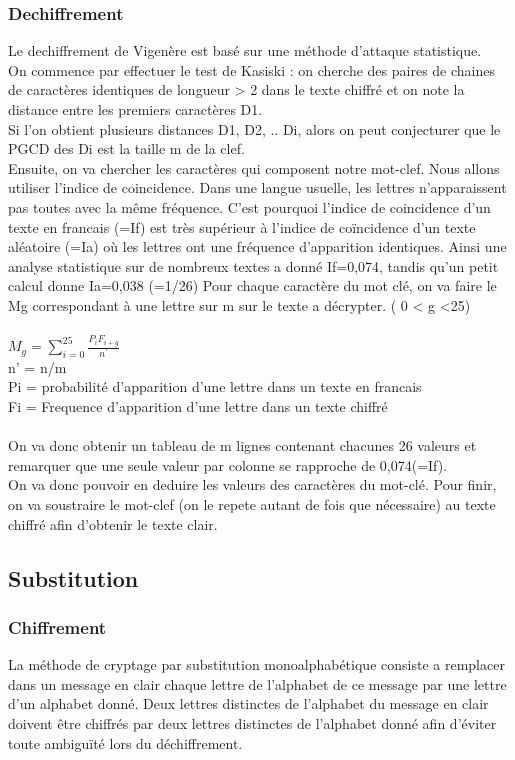 \documentclass[a4]{article}
\begin{document}
			\subsubsection{Dechiffrement}
				Le dechiffrement de Vigenère est basé sur une méthode d'attaque statistique.\\
				On commence par effectuer le test de Kasiski : on cherche des paires de chaines de 
				caractères identiques de longueur > 2 dans le texte chiffré et 
				on note la distance entre les premiers caractères D1.\\
				 Si l'on obtient plusieurs distances D1, D2, .. Di, alors on peut conjecturer que le
				  PGCD des Di est la taille m de la clef.\\
				Ensuite, on va chercher les caractères qui composent notre mot-clef. Nous allons 
				utiliser l'indice de coincidence. Dans une langue usuelle, 
				les lettres n'apparaissent pas toutes avec la même fréquence. C'est pourquoi l'indice 
				de coincidence d'un texte en francais 
				(=If) est très supérieur à l'indice de coïncidence d'un texte aléatoire (=Ia) où les 
				lettres ont une fréquence d'apparition identiques.
				 Ainsi une analyse statistique sur de nombreux textes a donné If=0,074, tandis qu'un 
				 petit calcul donne Ia=0,038 (=1/26)
				Pour chaque caractère du mot clé, on va faire le Mg correspondant à une lettre sur 
				m sur le texte a décrypter. ( 0 < g <25)\\ \\
				$M_{g} = \sum_{i=0}^{25} \frac{P_{i} F_{i+g}}{n^{'}}$\\
				n' = n/m\\
				Pi = probabilité d'apparition d'une lettre dans un texte en francais\\
				Fi = Frequence d'apparition d'une lettre dans un texte chiffré\\ \\
				On va donc obtenir un tableau de m lignes contenant chacunes 26 valeurs et remarquer 
				que une seule valeur par colonne se
				rapproche de 0,074(=If).\\
				On va donc pouvoir en deduire les valeurs des caractères du mot-clé.
				Pour finir, on va soustraire le mot-clef (on le repete autant de fois que nécessaire)
				 au texte chiffré afin d'obtenir le texte clair.
		\subsection{Substitution}
		
			\subsubsection{Chiffrement}
				La méthode de cryptage par substitution  monoalphabétique consiste a remplacer dans un 
				message en clair chaque lettre 
				de l’alphabet de ce message par une lettre d’un alphabet donné. Deux lettres distinctes 
				de l’alphabet du message en clair 
				doivent être chiffrés par deux lettres distinctes de l’alphabet donné afin d’éviter
				 toute ambiguïté lors du déchiffrement.
\end{document}
